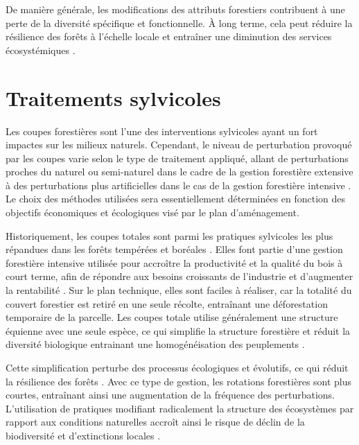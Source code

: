 De manière générale, les modifications des attributs forestiers contribuent à une perte de la diversité spécifique et fonctionnelle. 
À long terme, cela peut réduire la résilience des forêts à l'échelle locale et entraîner une diminution des services écosystémiques \citep{Hooper2012globalsynthesis,Edwards2014Maintainingecosystem}. 


\section*{Traitements sylvicoles}
\label{sec:sylvicole}

Les coupes forestières sont l'une des interventions sylvicoles ayant un fort impactes sur les milieux naturels. 
Cependant, le niveau de perturbation provoqué par les coupes varie selon le type de traitement appliqué, allant de perturbations proches du naturel ou semi-naturel dans le cadre de la gestion forestière extensive à des perturbations plus artificielles dans le cas de la gestion forestière intensive \citep{Ameray2021Forestcarbon}. 
Le choix des méthodes utilisées sera essentiellement déterminées en fonction des objectifs économiques et écologiques visé par le plan d'aménagement.

Historiquement, les coupes totales sont parmi les pratiques sylvicoles les plus répandues dans les forêts tempérées et boréales \citep{Fedrowitz2014Canretention,Chaudhary2016Impactforest}. 
Elles font partie d'une gestion forestière intensive utilisée pour accroître la productivité et la qualité du bois à court terme, afin de répondre aux besoins croissants de l'industrie et d'augmenter la rentabilité \citep{Irland2011TimberProductivitya}. 
Sur le plan technique, elles sont faciles à réaliser, car la totalité du couvert forestier est retiré en une seule récolte, entraînant une déforestation temporaire de la parcelle. 
Les coupes totale utilise généralement une structure équienne avec une seule espèce, ce qui simplifie la structure forestière et réduit la diversité biologique entrainant une homogénéisation des peuplements \citep{Rosenvald2008whatwhen}. 

Cette simplification perturbe des processus écologiques et évolutifs, ce qui réduit la résilience des forêts \citep{Holling2001UnderstandingComplexity}. 
Avec ce type de gestion, les rotations forestières sont plus courtes, entraînant ainsi une augmentation de la fréquence des perturbations. 
L’utilisation de pratiques modifiant radicalement la structure des écosystèmes par rapport aux conditions naturelles accroît ainsi le risque de déclin de la biodiversité et d’extinctions locales \citep{Hanski2000Extinctiondebt}. 

